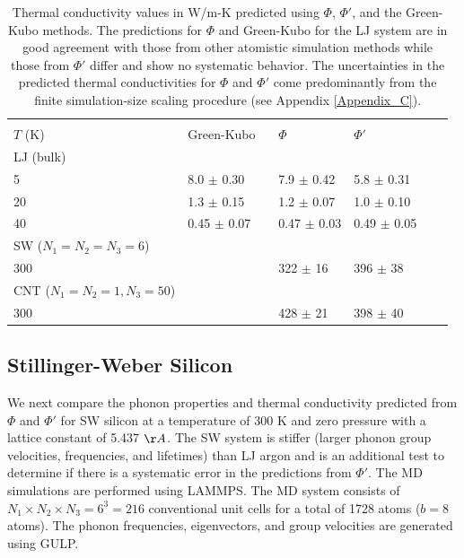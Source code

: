 \documentclass[aps,prb,preprint,superscriptaddress,amsmath,amssymb,floatfix]{revtex4}
\begin{document}
\begin{table}
\caption{\label{T:cond_table}Thermal conductivity values in W/m-K predicted using $\Phi$, $\Phi'$, and the Green-Kubo methods.  The predictions for $\Phi$ and Green-Kubo for the LJ system are in good agreement with those from other atomistic simulation methods\cite{turney2009a} while those from $\Phi'$ differ and show no systematic behavior. The uncertainties in the predicted thermal conductivities for $\Phi$ and $\Phi'$ come predominantly from the finite simulation-size scaling procedure (see Appendix \ref{Appendix_C}).}
\begin{ruledtabular}
\begin{tabular}{llllll}
     &                             &         &      &   \\
$T$ (K)&Green-Kubo \ &$\Phi$ &$\Phi'$\\
\hline
LJ (bulk)\\
5&8.0 $\pm$ 0.30 &7.9 $\pm$ 0.42 &5.8 $\pm$ 0.31 \\
20&1.3 $\pm$ 0.15 &1.2 $\pm$ 0.07 &1.0 $\pm$ 0.10 \\
40&0.45 $\pm$ 0.07 &0.47 $\pm$ 0.03 &0.49 $\pm$ 0.05 \\
\hline
SW ($N_1=N_2=N_3=6$) \\
300& &322 $\pm$ 16 &396 $\pm$ 38 \\
\hline
CNT ($N_1=N_2=1, N_3=50$) \\
300& &428 $\pm$ 21 &398 $\pm$ 40 \\
\end{tabular}
\end{ruledtabular}
\end{table}


\subsection{\label{S:Subsection_prop_SW}Stillinger-Weber Silicon}

We next compare the phonon properties and thermal conductivity predicted from $\Phi$ and $\Phi'$ for SW silicon \cite{stillinger1985} at a temperature of $300$ K and zero pressure with a lattice constant of 5.437 $\AA$. The SW system is stiffer (larger phonon group velocities, frequencies, and lifetimes) than LJ argon and is an additional test to determine if there is a systematic error in the predictions from $\Phi'$. The MD simulations are performed using LAMMPS.\cite{LAMMPS} The MD system consists
of $N_1 \times N_2 \times N_3 = 6^3 = 216$ conventional unit cells for a total of 1728 atoms ($b=8$ atoms). The phonon frequencies, eigenvectors, and group velocities are generated using GULP.\cite{GULP}
\end{document}
